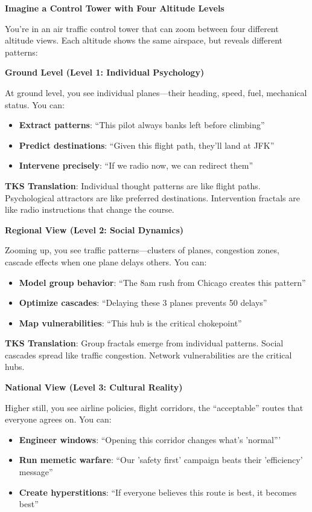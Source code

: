 \documentclass[11pt,twoside]{book}
\begin{document}
\begin{tcolorbox}[colback=green!5!white,colframe=green!65!black,title=\textbf{The Control Tower Metaphor},breakable]

\textbf{Imagine a Control Tower with Four Altitude Levels}

You're in an air traffic control tower that can zoom between four different altitude
views. Each altitude shows the same airspace, but reveals different patterns:

\bigskip
\textbf{Ground Level (Level 1: Individual Psychology)}

At ground level, you see individual planes---their heading, speed, fuel, mechanical
status. You can:
\begin{itemize}
    \item \textbf{Extract patterns}: ``This pilot always banks left before climbing''
    \item \textbf{Predict destinations}: ``Given this flight path, they'll land at JFK''
    \item \textbf{Intervene precisely}: ``If we radio now, we can redirect them''
\end{itemize}

\textbf{TKS Translation}: Individual thought patterns are like flight paths. Psychological
attractors are like preferred destinations. Intervention fractals are like radio
instructions that change the course.

\bigskip
\textbf{Regional View (Level 2: Social Dynamics)}

Zooming up, you see traffic patterns---clusters of planes, congestion zones, cascade
effects when one plane delays others. You can:
\begin{itemize}
    \item \textbf{Model group behavior}: ``The 8am rush from Chicago creates this pattern''
    \item \textbf{Optimize cascades}: ``Delaying these 3 planes prevents 50 delays''
    \item \textbf{Map vulnerabilities}: ``This hub is the critical chokepoint''
\end{itemize}

\textbf{TKS Translation}: Group fractals emerge from individual patterns. Social cascades
spread like traffic congestion. Network vulnerabilities are the critical hubs.

\bigskip
\textbf{National View (Level 3: Cultural Reality)}

Higher still, you see airline policies, flight corridors, the ``acceptable'' routes that
everyone agrees on. You can:
\begin{itemize}
    \item \textbf{Engineer windows}: ``Opening this corridor changes what's 'normal'''
    \item \textbf{Run memetic warfare}: ``Our 'safety first' campaign beats their 'efficiency' message''
    \item \textbf{Create hyperstitions}: ``If everyone believes this route is best, it becomes best''
\end{itemize}


\end{tcolorbox}
\end{document}
